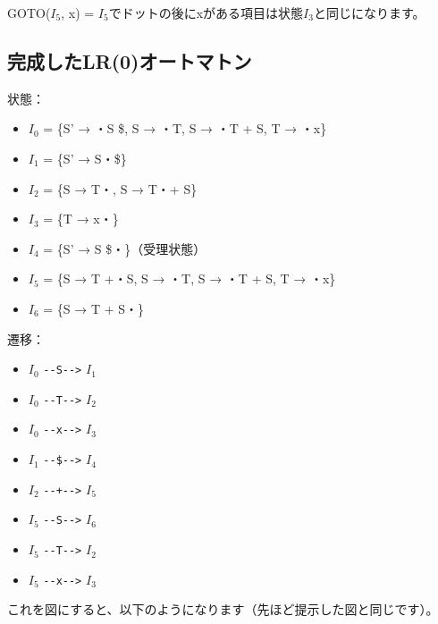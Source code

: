 GOTO(\(I_5\), x) =
\(I_5\)でドットの後にxがある項目は状態\(I_3\)と同じになります。

\subsection{完成したLR(0)オートマトン}

状態：

\begin{itemize}
\item
  \(I_0\) = \{S' → ・S \$, S → ・T, S → ・T + S, T → ・x\}
\item
  \(I_1\) = \{S' → S・\$\}
\item
  \(I_2\) = \{S → T・, S → T・+ S\}
\item
  \(I_3\) = \{T → x・\}
\item
  \(I_4\) = \{S' → S \$・\}（受理状態）
\item
  \(I_5\) = \{S → T +・S, S → ・T, S → ・T + S, T → ・x\}
\item
  \(I_6\) = \{S → T + S・\}
\end{itemize}

遷移：

\begin{itemize}
\item
  \(I_0\) \texttt{-\/-S-\/-\textgreater{}} \(I_1\)
\item
  \(I_0\) \texttt{-\/-T-\/-\textgreater{}} \(I_2\)
\item
  \(I_0\) \texttt{-\/-x-\/-\textgreater{}} \(I_3\)
\item
  \(I_1\) \texttt{-\/-\$-\/-\textgreater{}} \(I_4\)
\item
  \(I_2\) \texttt{-\/-+-\/-\textgreater{}} \(I_5\)
\item
  \(I_5\) \texttt{-\/-S-\/-\textgreater{}} \(I_6\)
\item
  \(I_5\) \texttt{-\/-T-\/-\textgreater{}} \(I_2\)
\item
  \(I_5\) \texttt{-\/-x-\/-\textgreater{}} \(I_3\)
\end{itemize}

これを図にすると、以下のようになります（先ほど提示した図と同じです）。

